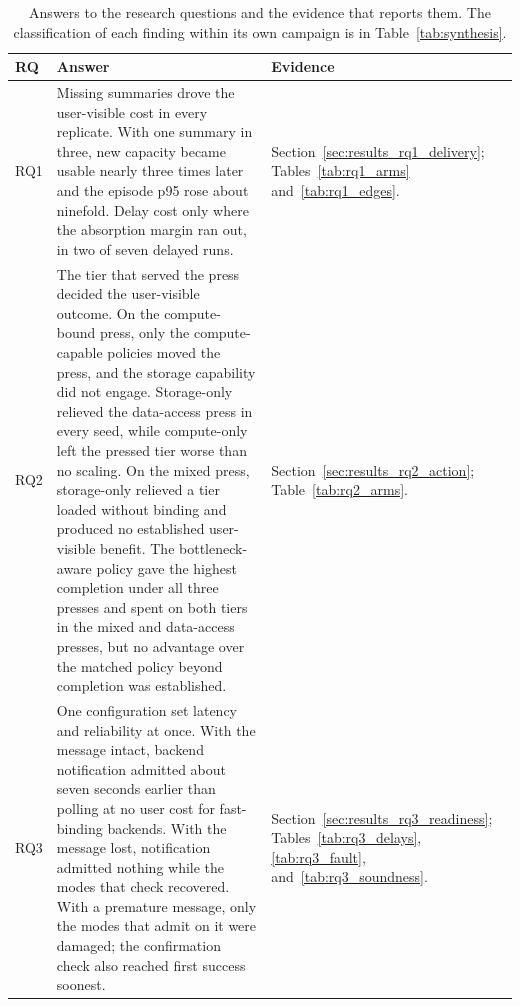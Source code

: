 ﻿\documentclass[12pt,reqno,twoside]{amsbook}
\begin{document}
\begin{table}[htbp]
    \centering
    \caption{Answers to the research questions and the evidence that reports
    them. The classification of each finding within its own campaign is in
    Table~\ref{tab:synthesis}.}
    \label{tab:ch6_answers}
    \footnotesize
    \setlength{\tabcolsep}{2pt}
    \setlength{\emergencystretch}{1em}
    \begin{tabular}{p{} p{} p{}}
        \toprule
        RQ & Answer & Evidence \\
        \midrule
        RQ1 & Missing summaries drove the user-visible cost in every
        replicate. With one summary in three, new capacity became usable nearly
        three times later and the episode p95 rose about ninefold. Delay cost
        only where the absorption margin ran out, in two of seven delayed runs.
        & Section~\ref{sec:results_rq1_delivery}; Tables~\ref{tab:rq1_arms}
        and~\ref{tab:rq1_edges}. \\
        RQ2 & The tier that served the press decided the user-visible
        outcome. On the compute-bound press, only the compute-capable policies
        moved the press, and the storage capability did not engage. Storage-only
        relieved the data-access press in every seed, while compute-only left
        the pressed tier worse than no scaling. On the mixed press, storage-only
        relieved a tier loaded without binding and produced no established
        user-visible benefit. The bottleneck-aware policy gave the highest
        completion under all three presses and spent on both tiers in the mixed
        and data-access presses, but no advantage over the matched policy
        beyond completion was established.
        & Section~\ref{sec:results_rq2_action}; Table~\ref{tab:rq2_arms}. \\
        RQ3 & One configuration set latency and reliability at once. With the
        message intact, backend notification admitted about seven seconds
        earlier than polling at no user cost for fast-binding backends. With
        the message lost, notification admitted nothing while the modes that
        check recovered. With a premature message, only the modes that admit
        on it were damaged; the confirmation check also reached first success
        soonest.
        & Section~\ref{sec:results_rq3_readiness};
        Tables~\ref{tab:rq3_delays}, \ref{tab:rq3_fault},
        and~\ref{tab:rq3_soundness}. \\
        \bottomrule
    \end{tabular}
\end{table}
\end{document}
